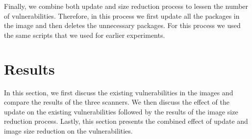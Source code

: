 \documentclass[a4paper,num-refs]{oup-contemporary}
\begin{document}
Finally, we combine both update and size reduction process
to lessen the number of vulnerabilities.
Therefore, in this process we first update all the packages in the image and then deletes
the unnecessary packages. For this process we used the same scripts that
we used for earlier experiments.

\section{Results}

In this section,
we first discuss the existing vulnerabilities in the images and compare the
results of the three scanners. We then discuss the effect of the update on the
existing vulnerabilities followed by the results of the image size reduction
process. Lastly, this section presents the combined effect of update and image size reduction on the
vulnerabilities.
\end{document}
